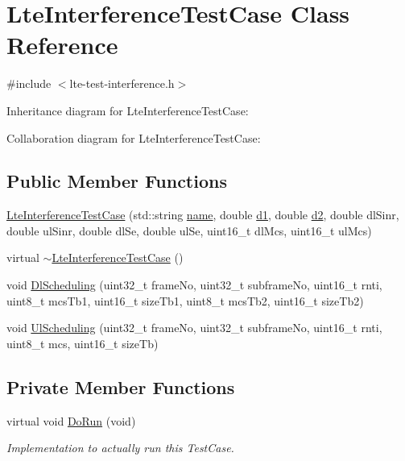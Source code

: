 \hypertarget{classLteInterferenceTestCase}{}\section{Lte\+Interference\+Test\+Case Class Reference}
\label{classLteInterferenceTestCase}


{\ttfamily \#include $<$lte-\/test-\/interference.\+h$>$}



Inheritance diagram for Lte\+Interference\+Test\+Case\+:


Collaboration diagram for Lte\+Interference\+Test\+Case\+:
\subsection*{Public Member Functions}
\begin{DoxyCompactItemize}
\item 
\hyperlink{classLteInterferenceTestCase_a0c8c7a9bec197d01f3d1dc63bd98f850}{Lte\+Interference\+Test\+Case} (std\+::string \hyperlink{generate__test__data__lte__spectrum__model_8m_ab74e6bf80237ddc4109968cedc58c151}{name}, double \hyperlink{lte__uplink__power__control_8m_a6a56223849c00f2bb062c6e55d2954df}{d1}, double \hyperlink{lte__link__budget__interference__fr_8m_a479b78c01efbe4664b402a300da492f7}{d2}, double dl\+Sinr, double ul\+Sinr, double dl\+Se, double ul\+Se, uint16\+\_\+t dl\+Mcs, uint16\+\_\+t ul\+Mcs)
\item 
virtual \hyperlink{classLteInterferenceTestCase_a38f69ce5c7dbc3ee8d1305e32b65e295}{$\sim$\+Lte\+Interference\+Test\+Case} ()
\item 
void \hyperlink{classLteInterferenceTestCase_a0eef0ef3201a7cc394e68ebc4f7f18ec}{Dl\+Scheduling} (uint32\+\_\+t frame\+No, uint32\+\_\+t subframe\+No, uint16\+\_\+t rnti, uint8\+\_\+t mcs\+Tb1, uint16\+\_\+t size\+Tb1, uint8\+\_\+t mcs\+Tb2, uint16\+\_\+t size\+Tb2)
\item 
void \hyperlink{classLteInterferenceTestCase_a52294c9a02a1b183d1d99478d60176a5}{Ul\+Scheduling} (uint32\+\_\+t frame\+No, uint32\+\_\+t subframe\+No, uint16\+\_\+t rnti, uint8\+\_\+t mcs, uint16\+\_\+t size\+Tb)
\end{DoxyCompactItemize}
\subsection*{Private Member Functions}
\begin{DoxyCompactItemize}
\item 
virtual void \hyperlink{classLteInterferenceTestCase_adc059d120a4d9effd2ca5f6fecaae31a}{Do\+Run} (void)
\begin{DoxyCompactList}\small\item\em Implementation to actually run this Test\+Case. \end{DoxyCompactList}\end{DoxyCompactItemize}
